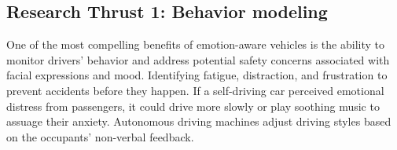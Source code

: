 \subsection{Research Thrust 1: Behavior modeling}
\label{sec:behaviour}

One of the most compelling benefits of emotion-aware vehicles is the ability to monitor drivers’ behavior and address potential safety concerns associated with facial expressions and mood.
Identifying fatigue, distraction, and frustration to prevent accidents before they happen.
If a self-driving car perceived emotional distress from passengers, it could drive more slowly or play soothing music to assuage their anxiety.
Autonomous driving machines adjust driving styles based on the occupants’ non-verbal feedback.

